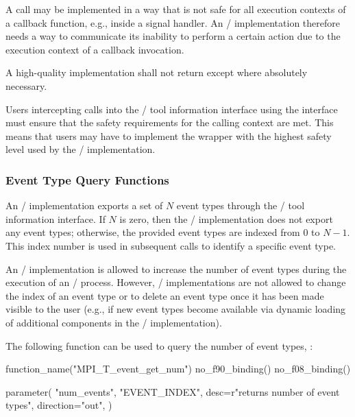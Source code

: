 \begin{rationale}
    A call may be implemented in a way that is not safe for all execution
    contexts of a callback function, e.g., inside a signal handler. An \MPI/
    implementation therefore needs a way to communicate its inability to perform
    a certain action due to the execution context of a callback invocation.
\end{rationale}

\begin{implementors}
    A high-quality implementation shall not return 
    except where absolutely necessary.
\end{implementors}

\begin{users}
    Users intercepting calls into the \MPI/ tool information interface using
    the  interface must ensure that the safety requirements for the calling
    context are met.  This means that users may have to implement the
    wrapper with the highest safety level used by the \MPI/ implementation.
\end{users}


\subsubsection{Event Type Query Functions}

An \MPI/ implementation exports a set of $N$ event types through the \MPI/
tool information interface. If $N$ is zero, then the \MPI/ implementation
does not export any event types; otherwise, the provided event types
are indexed from $0$ to $N-1$. This index number is used in subsequent
calls to identify a specific event type.

An \MPI/ implementation is allowed to increase the number of event types
during the execution of an \MPI/ process.
However, \MPI/ implementations are not
allowed to change the index of an event type or to delete an event type
once it has been made visible to the user (e.g., if new event types
become available via dynamic loading of additional components in the
\MPI/ implementation).

The following function can be used to query the number of event types, :

\begin{mpi-binding}
    function_name("MPI_T_event_get_num")
    no_f90_binding()
    no_f08_binding()

    parameter(
        "num_events",
        "EVENT_INDEX",
        desc=r"returns number of event types",
        direction="out",
    )
\end{mpi-binding}

